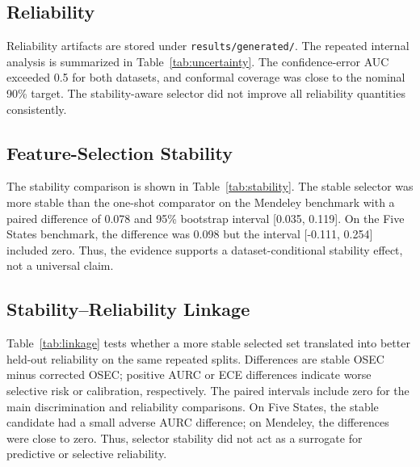 \documentclass[journal]{IEEEtran}
\begin{document}
\begin{table}[t]
\centering
\caption{Schema-corrected bounded nested sensitivity results.}
\label{tab:schema_corrected}

\end{table}

\subsection{Reliability}
Reliability artifacts are stored under \texttt{results/generated/}. The
repeated internal analysis is summarized in Table~\ref{tab:uncertainty}. The
confidence-error AUC exceeded 0.5 for both datasets, and conformal coverage was
close to the nominal 90\% target. The stability-aware selector did not improve
all reliability quantities consistently.

\begin{table}[t]
\centering
\caption{Repeated internal selective-reliability evidence. Values are means
over ten seeds; confidence intervals are stored in the machine-readable result
files.}
\label{tab:uncertainty}

\end{table}

\subsection{Feature-Selection Stability}
The stability comparison is shown in Table~\ref{tab:stability}. The stable
selector was more stable than the one-shot comparator on the Mendeley benchmark
with a paired difference of 0.078 and 95\% bootstrap interval [0.035, 0.119].
On the Five States benchmark, the difference was 0.098 but the interval
[-0.111, 0.254] included zero. Thus, the evidence supports a dataset-conditional
stability effect, not a universal claim.

\begin{table}[t]
\centering
\caption{Repeated feature-selection stability evidence. $\Phi$ is the
chance-corrected stability statistic.}
\label{tab:stability}

\end{table}

\subsection{Stability--Reliability Linkage}
Table~\ref{tab:linkage} tests whether a more stable selected set translated into
better held-out reliability on the same repeated splits. Differences are
stable OSEC minus corrected OSEC; positive AURC or ECE differences indicate
worse selective risk or calibration, respectively. The paired intervals include
zero for the main discrimination and reliability comparisons. On Five States,
the stable candidate had a small adverse AURC difference; on Mendeley, the
differences were close to zero. Thus, selector stability did not act as a
surrogate for predictive or selective reliability.
\end{document}
